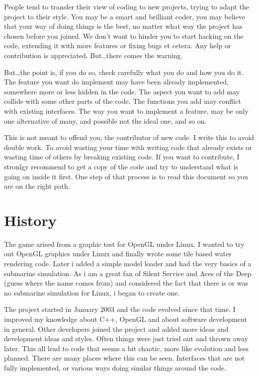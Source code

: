 \documentclass[english,a4paper,12pt]{report}
\begin{document}
People tend to transfer their view of coding to new projects, trying to
adapt the project to their style. You may be a smart and brilliant
coder, you may believe that your way of doing things is the best, no
matter what way the project has chosen before you joined. We don't want
to hinder you to start hacking on the code, extending it with more
features or fixing bugs et cetera.  Any help or contribution is
appreciated. But\ldots there comes the warning.

But\ldots the point is, if you do so, check carefully what you do and
how you do it. The feature you want do implement may have been already
implemented, somewhere more or less hidden in the code. The aspect you
want to add may collide with some other parts of the code. The functions
you add may conflict with existing interfaces. The way you want to
implement a feature, may be only one alternative of many, and possible
not the ideal one, and so on.

This is not meant to offend you, the contributor of new code. I write
this to avoid double work. To avoid wasting your time with writing code
that already exists or wasting time of others by breaking existing code.
If you want to contribute, I stronlgy recommend to get a copy of the
code and try to understand what is going on inside it first. One step of
that process is to read this document so you are on the right path.

\section{History}

The game arised from a graphic test for OpenGL under Linux. I wanted to
try out OpenGL graphics under Linux and finally wrote some tile based
water rendering code. Later i added a simple model loader and had the
very basics of a submarine simulation. As i am a great fan of Silent
Service and Aces of the Deep (guess where the name comes from) and
considered the fact that there is or was no submarine simulation for
Linux, i began to create one.
    
The project started in January 2003 and the code evolved since that
time. I improved my knowledge about C++, OpenGL and about software
development in general. Other developers joined the project and added
more ideas and development ideas and styles. Often things were just
tried out and thrown away later. This all lead to code that seems a bit
chaotic, more like evolution and less planned. There are many places
where this can be seen. Interfaces that are not fully implemented, or
various ways doing similar things around the code.
  
\end{document}
